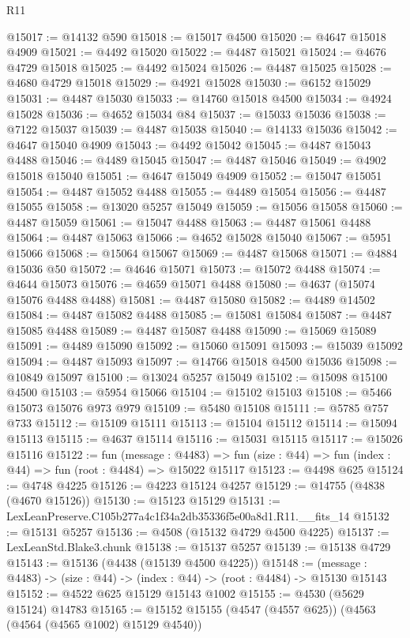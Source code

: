 \begin{lexlean}{R11}
\begin{coremodule}
@15017 := @14132 @590
@15018 := @15017 @4500
@15020 := @4647 @15018 @4909
@15021 := @4492 @15020
@15022 := @4487 @15021
@15024 := @4676 @4729 @15018
@15025 := @4492 @15024
@15026 := @4487 @15025
@15028 := @4680 @4729 @15018
@15029 := @4921 @15028
@15030 := @6152 @15029
@15031 := @4487 @15030
@15033 := @14760 @15018 @4500
@15034 := @4924 @15028
@15036 := @4652 @15034 @84
@15037 := @15033 @15036
@15038 := @7122 @15037
@15039 := @4487 @15038
@15040 := @14133 @15036
@15042 := @4647 @15040 @4909
@15043 := @4492 @15042
@15045 := @4487 @15043 @4488
@15046 := @4489 @15045
@15047 := @4487 @15046
@15049 := @4902 @15018 @15040
@15051 := @4647 @15049 @4909
@15052 := @15047 @15051
@15054 := @4487 @15052 @4488
@15055 := @4489 @15054
@15056 := @4487 @15055
@15058 := @13020 @5257 @15049
@15059 := @15056 @15058
@15060 := @4487 @15059
@15061 := @15047 @4488
@15063 := @4487 @15061 @4488
@15064 := @4487 @15063
@15066 := @4652 @15028 @15040
@15067 := @5951 @15066
@15068 := @15064 @15067
@15069 := @4487 @15068
@15071 := @4884 @15036 @50
@15072 := @4646 @15071
@15073 := @15072 @4488
@15074 := @4644 @15073
@15076 := @4659 @15071 @4488
@15080 := @4637 (@15074 @15076 @4488 @4488)
@15081 := @4487 @15080
@15082 := @4489 @14502
@15084 := @4487 @15082 @4488
@15085 := @15081 @15084
@15087 := @4487 @15085 @4488
@15089 := @4487 @15087 @4488
@15090 := @15069 @15089
@15091 := @4489 @15090
@15092 := @15060 @15091
@15093 := @15039 @15092
@15094 := @4487 @15093
@15097 := @14766 @15018 @4500 @15036
@15098 := @10849 @15097
@15100 := @13024 @5257 @15049
@15102 := @15098 @15100 @4500
@15103 := @5954 @15066
@15104 := @15102 @15103
@15108 := @5466 @15073 @15076 @973 @979
@15109 := @5480 @15108
@15111 := @5785 @757 @733
@15112 := @15109 @15111
@15113 := @15104 @15112
@15114 := @15094 @15113
@15115 := @4637 @15114
@15116 := @15031 @15115
@15117 := @15026 @15116
@15122 := fun (message : @4483) =>
  fun (size : @44) => fun (index : @44) => fun (root : @4484) => @15022 @15117
@15123 := @4498 @625
@15124 := @4748 @4225
@15126 := @4223 @15124 @4257
@15129 := @14755 (@4838 (@4670 @15126))
@15130 := @15123 @15129
@15131 := LexLeanPreserve.C105b277a4c1f34a2db35336f5e00a8d1.R11.__fits_14
@15132 := @15131 @5257
@15136 := @4508 (@15132 @4729 @4500 @4225)
@15137 := LexLeanStd.Blake3.chunk
@15138 := @15137 @5257
@15139 := @15138 @4729
@15143 := @15136 (@4438 (@15139 @4500 @4225))
@15148 := (message : @4483) -> (size : @44) -> (index : @44) -> (root : @4484) -> @15130 @15143
@15152 := @4522 @625 @15129 @15143 @1002
@15155 := @4530 (@5629 @15124) @14783
@15165 := @15152 @15155 (@4547 (@4557 @625)) (@4563 (@4564 (@4565 @1002) @15129 @4540))

\end{coremodule}
\end{lexlean}
